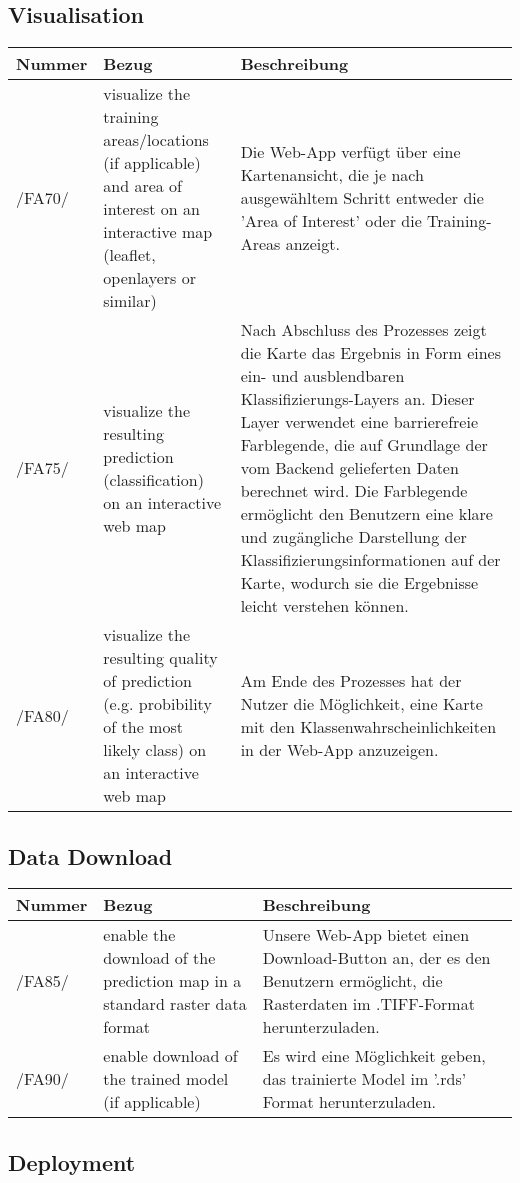 \documentclass[a4paper,12pt]{article}
\newcommand{\addrow}[3]{#1 &#2 &#3 \\ [0.2cm]}
\newcommand{\addheading}[3]{#1 &#2 &#3\\ \hline }
\newcommand{\tabularhead}{\begin{tabular}{l p{5cm} p{8cm}}
\hline
}
\newenvironment{usecase}{\tabularhead}
{\hline\end{tabular}}
\begin{document}
\subsection{Visualisation}



\begin{usecase}
  \addheading{Nummer}{Bezug}{Beschreibung} 
  \addrow{/FA70/}{visualize the training areas/locations (if applicable) and area of interest on an interactive map (leaflet, openlayers or similar)}{Die Web-App verfügt über eine Kartenansicht, die je nach ausgewähltem Schritt entweder die 'Area of Interest' oder die Training-Areas anzeigt.}
  \addrow{/FA75/}{visualize the resulting prediction (classification) on an interactive web map}{Nach Abschluss des Prozesses zeigt die Karte das Ergebnis in Form eines ein- und ausblendbaren Klassifizierungs-Layers an. Dieser Layer verwendet eine barrierefreie Farblegende, die auf Grundlage der vom Backend gelieferten Daten berechnet wird. Die Farblegende ermöglicht den Benutzern eine klare und zugängliche Darstellung der Klassifizierungsinformationen auf der Karte, wodurch sie die Ergebnisse leicht verstehen können.}
  \addrow{/FA80/}{visualize the resulting quality of prediction (e.g. probibility of
the most likely class) on an interactive web map}{Am Ende des Prozesses hat der Nutzer die Möglichkeit, eine Karte mit den Klassenwahrscheinlichkeiten in der Web-App anzuzeigen.}

\end{usecase}

\subsection{Data Download}

\begin{usecase}
  \addheading{Nummer}{Bezug}{Beschreibung} 
  \addrow{/FA85/}{enable the download of the prediction map in a standard raster data format}{  Unsere Web-App bietet einen Download-Button an, der es den Benutzern ermöglicht, die Rasterdaten im .TIFF-Format herunterzuladen.}
  \addrow{/FA90/}{enable download of the trained model (if applicable)}{Es wird eine Möglichkeit geben, das trainierte Model im '.rds' Format herunterzuladen.}

\end{usecase}

\subsection{Deployment}
\end{document}
